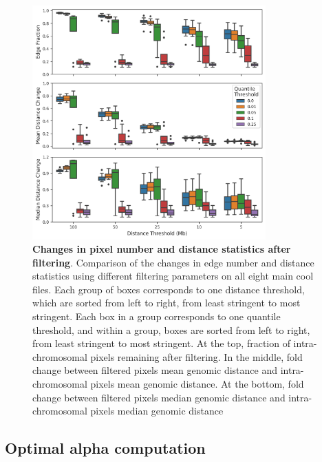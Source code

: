 \begin{figure}[hb]
  \centering
  \includegraphics[width=0.8\textwidth]{filtering_stats.png}
  \caption{\textbf{Changes in pixel number and distance statistics after filtering}. Comparison of the changes in edge number and distance statistics using different filtering parameters on all eight main cool files. Each group of boxes corresponds to one distance threshold, which are sorted from left to right, from least stringent to most stringent. Each box in a group corresponds to one quantile threshold, and within a group, boxes are sorted from left to right, from least stringent to most stringent. At the top, fraction of intra-chromosomal pixels remaining after filtering. In the middle, fold change between filtered pixels mean genomic distance and intra-chromosomal pixels mean genomic distance. At the bottom, fold change between filtered pixels median genomic distance and intra-chromosomal pixels median genomic distance}
  \label{fig:filtering}
\end{figure}


\subsection{Optimal alpha computation}

